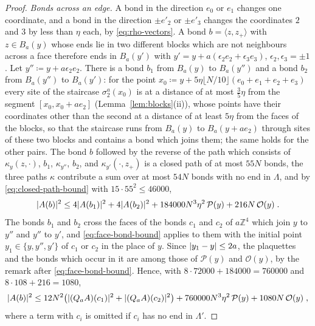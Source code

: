 \documentclass[11pt]{preprint}
\DeclarePairedDelimiter{\abs}{\lvert}{\rvert}
\numberwithin{equation}{section}
\theoremstyle{definition}
\theoremstyle{remark}
\theoremstyle{plain}
\begin{document}
\begin{proof}
\emph{Bonds across an edge.} A bond in the direction $e_0$ or $e_1$ changes one coordinate, and a bond in the direction $\pm e'_2$ or $\pm e'_3$ changes the coordinates $2$ and $3$ by less than $\eta$ each, by \eqref{eq:rho-vectors}. A bond $b = \langle z, z_+\rangle$ with $z \in B_a(y)$ whose ends lie in two different blocks which are not neighbours across a face therefore ends in $B_a(y')$ with $y' = y + a(\epsilon_2e_2 + \epsilon_3e_3)$, $\epsilon_2, \epsilon_3 = \pm1$. Let $y'' \coloneqq y + a\epsilon_2e_2$. There is a bond $b_1$ from $B_a(y)$ to $B_a(y'')$ and a bond $b_2$ from $B_a(y'')$ to $B_a(y')$: for the point $x_0 \coloneqq y + 5\eta\lfloor N/10\rfloor(e_0 + e_1 + e_2 + e_3)$ every site of the staircase $\sigma^a_2(x_0)$ is at a distance of at most $\frac35\eta$ from the segment $[x_0, x_0 + ae_2]$ (Lemma~\ref{lem:blocks}(ii)), whose points have their coordinates other than the second at a distance of at least $5\eta$ from the faces of the blocks, so that the staircase runs from $B_a(y)$ to $B_a(y + ae_2)$ through sites of these two blocks and contains a bond which joins them; the same holds for the other pairs. The bond $b$ followed by the reverse of the path which consists of $\kappa_y(z, \cdot)$, $b_1$, $\kappa_{y''}$, $b_2$, and $\kappa_{y'}(\cdot, z_+)$ is a closed path of at most $55N$ bonds, the three paths $\kappa$ contribute a sum over at most $54N$ bonds with no end in $\Lambda$, and by \eqref{eq:closed-path-bound} with $15 \cdot 55^2 \leq 46000$,
\begin{equation}\label{eq:edge-bond}
    \abs{A(b)}^2 \leq 4\abs{A(b_1)}^2 + 4\abs{A(b_2)}^2 + 184000N^3\eta^2\,\mathcal P(y) + 216N\,\mathcal O(y)\;.
\end{equation}
The bonds $b_1$ and $b_2$ cross the faces of the bonds $c_1$ and $c_2$ of $a\mathbb Z^4$ which join $y$ to $y''$ and $y''$ to $y'$, and \eqref{eq:face-bond-bound} applies to them with the initial point $y_1 \in \{ y, y'', y' \}$ of $c_1$ or $c_2$ in the place of $y$. Since $\abs{y_1 - y} \leq 2a$, the plaquettes and the bonds which occur in it are among those of $\mathcal P(y)$ and $\mathcal O(y)$, by the remark after \eqref{eq:face-bond-bound}. Hence, with $8 \cdot 72000 + 184000 = 760000$ and $8 \cdot 108 + 216 = 1080$,
\begin{equation}\label{eq:edge-bond-bound}
    \abs{A(b)}^2 \leq 12N^2\bigl(\abs{(Q_aA)(c_1)}^2 + \abs{(Q_aA)(c_2)}^2\bigr) + 760000N^3\eta^2\,\mathcal P(y) + 1080N\,\mathcal O(y)\;,
\end{equation}
where a term with $c_i$ is omitted if $c_i$ has no end in $\Lambda'$.


\end{proof}
\end{document}
